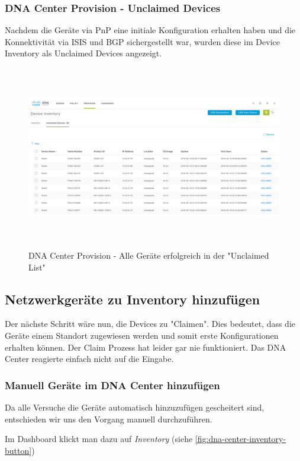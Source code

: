\subsubsection{DNA Center Provision - Unclaimed Devices}

Nachdem die Geräte via PnP eine initiale Konfiguration erhalten haben und die Konnektivität via ISIS und BGP sichergestellt war, wurden diese im Device Inventory als Unclaimed Devices angezeigt.

\begin{figure}[H]
	\centering
	\includegraphics[height=8cm]{img/DNA_Center_All_Fabric2_Unclaimed.PNG}
	\caption{DNA Center Provision - Alle Geräte erfolgreich in der "Unclaimed List"}
	\label{fig:dna-center-provision-unclaimed}
\end{figure} 


\subsection{Netzwerkgeräte zu Inventory hinzufügen}

Der nächste Schritt wäre nun, die Devices zu "Claimen". Dies bedeutet, dass die Geräte einem Standort zugewiesen werden und somit erste Konfigurationen erhalten können. Der Claim Prozess hat leider gar nie funktioniert. Das DNA Center reagierte einfach nicht auf die Eingabe.

\subsubsection{Manuell Geräte im DNA Center hinzufügen}
Da alle Versuche die Geräte automatisch hinzuzufügen gescheitert sind, entschieden wir uns den Vorgang manuell durchzuführen. 

Im Dashboard klickt man dazu auf \textit{Inventory} (siehe \ref{fig:dna-center-inventory-button})

